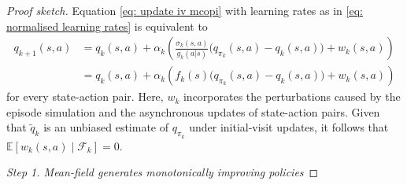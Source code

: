 \documentclass{article}
\begin{document}
\begin{proof}[Proof sketch]
Equation \eqref{eq: update iv mcopi} with learning rates as in \eqref{eq: normalised learning rates} is equivalent to
\begin{align}
\nonumber
    q_{k+1}(s,a)
    &=
    q_k(s,a) + \alpha_k \left( \frac{\sigma_k(s,a)}{g_k(a|s)} \big( q_{\pi_k}(s,a) - q_k(s,a) \big) + w_k(s,a) \right)
    \\
\label{eq: iv mcopi in stochastic theorem}
    &=
    q_k(s,a) + \alpha_k \left( f_k(s) \big( q_{\pi_k}(s,a) - q_k(s,a) \big) + w_k(s,a) \right)
\end{align}
for every state-action pair.
Here, $w_k$ incorporates the perturbations caused by the episode simulation and the asynchronous updates of state-action pairs.
Given that $\tilde q_k$ is an unbiased estimate of $q_{\pi_k}$ under initial-visit updates, it follows that $\mathbb E[w_k(s,a) \mid \mathcal F_k] = 0$.


    
\textit{Step 1. Mean-field generates monotonically improving policies}


\end{proof}
\end{document}
